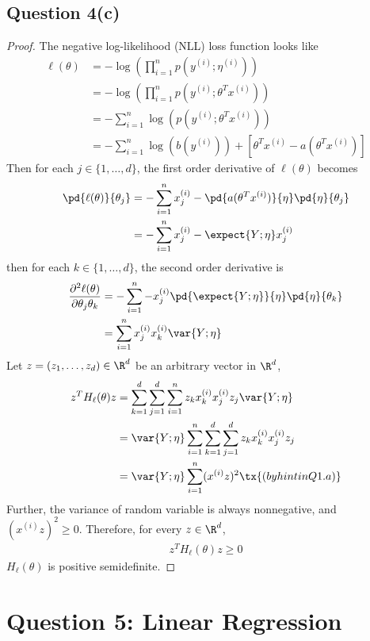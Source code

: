 \documentclass[11pt]{article}
\newcommand{\upi}[0]{^{(i)}}
\begin{document}
	\subsection{Question 4(c)}
	\begin{proof}
		The negative log-likelihood (NLL) loss function looks like
		\begin{align}
			\ell(\theta) &= - \log \left(
				\prod_{i=1}^n p(y\upi; \eta\upi)
			\right) \\
			&= - \log \left(
				\prod_{i=1}^n p(y\upi; \theta^T x\upi)
			\right) \\
			&= - \sum_{i=1}^n \log(p(y\upi; \theta^T x\upi)) \\
			&= - \sum_{i=1}^n \log (b(y\upi)) + [\theta^T x\upi - a(\theta^T x\upi)]
		\end{align}
		Then for each $j \in \{1, \dots, d\}$, the first order derivative of $\ell(\theta)$ becomes
		\begin{align}
			\pd{\ell(\theta)}{\theta_j} &= - \sum_{i=1}^n x\upi_j - \pd{a(\theta^T x\upi)}{\eta} \pd{\eta}{\theta_j} \\
			&= - \sum_{i=1}^n x\upi_j - \expect{Y; \eta} x\upi_j
		\end{align}
		then for each $k \in \{1, \dots, d\}$, the second order derivative is 
		\begin{align}
			\frac{\partial^2 \ell(\theta)}{\partial \theta_j \theta_k} &= - \sum_{i=1}^n - x_j\upi \pd{\expect{Y; \eta}}{\eta} \pd{\eta}{\theta_k} \\
			&= \sum_{i=1}^n x_j\upi x_k\upi \var{Y; \eta}
		\end{align}
		Let $z = (z_1, \dots, z_d) \in \R^d$ be an arbitrary vector in $\R^d$, 
		\begin{align}
			z^T H_\ell (\theta) z &= \sum_{k=1}^d \sum_{j=1}^d \sum_{i=1}^n z_k x\upi_k x\upi_j z_j \var{Y; \eta} \\
			&= \var{Y; \eta} \sum_{i=1}^n \sum_{k=1}^d \sum_{j=1}^d z_k x\upi_k x\upi_j z_j \\
			&= \var{Y; \eta} \sum_{i=1}^n (x\upi z)^2 \tx{ (by hint in Q1.a)}
		\end{align}
		Further, the variance of random variable is always nonnegative, and $(x\upi z)^2 \geq 0$. Therefore, for every $z \in \R^d$, 
		\begin{align}
			z^T H_\ell (\theta) z \geq 0
		\end{align}
		$H_\ell (\theta)$ is positive semidefinite.
	\end{proof}
	
	\newpage
	\section{Question 5: Linear Regression}
\end{document}
